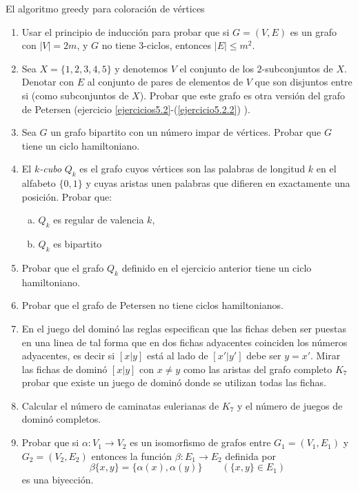 \begin{section}{El algoritmo greedy para coloración de vértices}
\begin{enumerate}[1)]
\item Usar el principio de inducción para probar que si $G=(V,E)$ es un
grafo con $|V|=2m$, y $G$ no tiene $3$-ciclos, entonces $|E|\le
m^2$.

\item Sea $X=\{1,2,3,4,5\}$ y denotemos $V$ el conjunto de los
$2$-subconjuntos de $X$. Denotar con $E$ al conjunto de pares de
elementos de $V$ que son disjuntos entre si (como subconjuntos de
$X$). Probar que este grafo es otra versión del grafo de Petersen
(ejercicio \ref{ejercicios5.2}-(\ref{ejercicio5.2.2}) ).

\item Sea $G$ un grafo bipartito con un número impar de vértices. Probar
que $G$ tiene un ciclo hamiltoniano.

\item El {\em $k$-cubo} $Q_k$ es el grafo cuyos vértices son las
palabras de longitud $k$ en el alfabeto $\{0,1\}$ y cuyas aristas
unen palabras que difieren en exactamente una posición. Probar
que:
\begin{enumerate}[a)]
	\item $Q_k$ es regular de valencia $k$,
	
	\item $Q_k$ es bipartito
\end{enumerate}

\item Probar que el grafo $Q_k$ definido en el ejercicio anterior tiene
un ciclo hamiltoniano.

\item Probar que el grafo de Petersen no tiene ciclos hamiltonianos.

\item En el juego del dominó las reglas especifican que las fichas deben
ser puestas en una linea de tal forma que en dos fichas adyacentes
coinciden los números adyacentes, es decir si $[x|y]$ está al lado
de $[x'|y']$ debe ser $y=x'$. Mirar las fichas de dominó $[x|y]$
con $x\not=y$ como las aristas del grafo completo $K_7$ probar que
existe un juego de dominó donde se utilizan todas las fichas.

\item Calcular el número de caminatas eulerianas de $K_7$ y el número de
juegos de dominó completos.

\item Probar que si $\alpha: V_1 \to  V_2$ es un isomorfismo de grafos
entre $G_1=(V_1,E_1)$ y  $G_2=(V_2,E_2)$ entonces la función
$\beta:E_1 \to  E_2$ definida por
$$
\beta\{x,y\} = \{\alpha(x),\alpha(y)\} \qquad (\{x,y\} \in E_1)
$$
es una biyección.


\end{enumerate}
\end{section}
